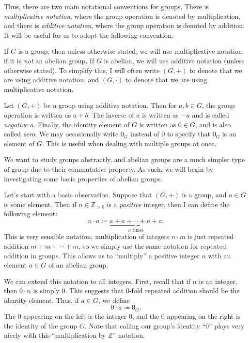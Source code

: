Thus, there are two main notational conventions for groups. There is \emph{multiplicative notation}, where the group operation is denoted by multiplication, and there is \emph{additive notation}, where the group operation is denoted by addition. It will be useful for us to adopt the following convention.

\begin{convention}\label{convention:mult-add}
	If $G$ is a group, then unless otherwise stated, we will use multiplicative notation if it is \emph{not} an abelian group. If $G$ is abelian, we will use additive notation (unless otherwise stated). To simplify this, I will often write $(G,+)$ to denote that we are using additive notation, and $(G,\cdot )$ to denote that we are using multiplicative notation.
\end{convention}

\begin{notation}\label{notation:additive}
	Let $(G,+)$ be a group using additive notation. Then for $a,b\in G$, the group operation is written as $a+b$. The inverse of $a$ is written as $-a$ and is called \emph{negative $a$}. Finally, the identity element of $G$ is written as $0\in G$, and is also called \emph{zero}. We may occasionally write $0_G$ instead of $0$ to specify that $0_G$ is an element of $G$. This is useful when dealing with multiple groups at once.
\end{notation}

We want to study groups abstractly, and abelian groups are a much simpler type of group due to their commutative property. As such, we will begin by investigating some basic properties of abelian groups.

Let's start with a basic observation. Suppose that $(G,+)$ is a group, and $a\in G$ is some element. Then if $n\in\mathbb{Z}_{>0} $ is a \emph{positive} integer, then I can define the following element:
\[
	n\cdot a\coloneqq \underbrace{a+a+\cdots +a+a}_{n\text{ times}}
.\]
This is very sensible notation; multiplication of integers $n\cdot m$ is just repeated addition $m+m+\cdots +m$, so we simply use the same notation for repeated addition in groups. This allows us to ``multiply'' a positive integer $n$ with an element $a\in G$ of an abelian group.

We can extend this notation to all integers. First, recall that if $n$ is an integer, then $0\cdot n$ is simply $0$. This suggests that 0-fold repeated addition should be the identity element. Thus, if $a\in G$, we define
\[
	0\cdot a\coloneqq 0_G
.\]
The 0 appearing on the left is the integer 0, and the 0 appearing on the right is the identity of the group $G$. Note that calling our group's identity ``0'' plays very nicely with this ``multiplication by $\mathbb{Z} $'' notation.

